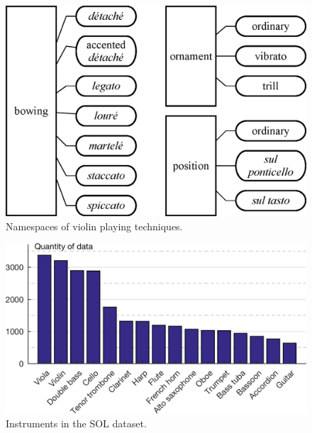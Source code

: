 \begin{figure}
\centering
\includegraphics[width=\linewidth]{./figs/dendrograms/technique-dendrogram.eps}
\caption{Namespaces of violin playing techniques.}
\label{fig:technique-dendrogram}
\end{figure}
\begin{figure}
\centering
\includegraphics[width=0.98\linewidth]{./figs/histogram/histogram_instruments.png}
\caption{Instruments in the SOL dataset.}
\label{fig:instrument-histogram}
\end{figure}
